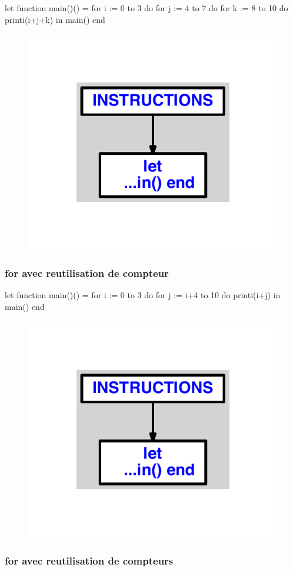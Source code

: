 \documentclass{article}
\begin{document}
\begin{verbatimtab}
let
	function main()() =
		for i := 0 to 3 do
			for j := 4 to 7 do
				for k := 8 to 10 do
					printi(i+j+k)
in main() end
\end{verbatimtab}
\begin{figure}[H]\centering\includegraphics[max width=\textwidth]{ast/ast_201.pdf}\end{figure}\subsubsection{for avec reutilisation de compteur}
\begin{verbatimtab}
let
	function main()() =
		for i := 0 to 3 do
			for j := i+4 to 10 do
				printi(i+j)
in main() end
\end{verbatimtab}
\begin{figure}[H]\centering\includegraphics[max width=\textwidth]{ast/ast_202.pdf}\end{figure}\subsubsection{for avec reutilisation de compteurs}
\end{document}
